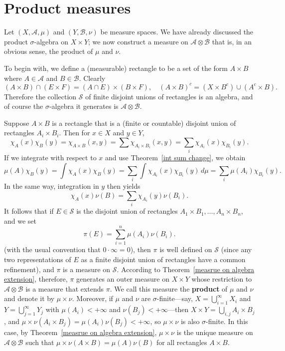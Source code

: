 \section{Product measures}\label{product measure}
Let $(X,\mathcal{A},\mu)$ and $(Y,\mathcal{B},\nu)$ be measure spaces. We have already discussed the product $\sigma$-algebra  on $X\times Y$; we now construct a measure on $\mathcal{A}\otimes\mathcal{B}$ that is, in an obvious sense, the product of $\mu$ and $\nu$.\par
To begin with, we define a (measurable) rectangle to be a set of the form $A\times B$ where $A\in\mathcal{A}$ and $B\in\mathcal{B}$. Clearly
\[(A\times B)\cap(E\times F)=(A\cap E)\times(B\times F),\quad(A\times B)^c=(X\times B^c)\cup(A^c\times B).\]
Therefore the collection $\mathcal{S}$ of finite disjoint unions of rectangles is an algebra, and of course the $\sigma$-algebra it generates is $\mathcal{A}\otimes\mathcal{B}$.\par
Suppose $A\times B$ is a rectangle that is a (finite or countable) disjoint union of rectangles $A_i\times B_i$. Then for $x\in X$ and $y\in Y$,
\[\chi_A(x)\chi_B(y)=\chi_{A\times B}(x,y)=\sum\chi_{A_i\times B_i}(x,y)=\sum_i\chi_{A_i}(x)\chi_{B_i}(y).\]
If we integrate with respect to $x$ and use Theorem~\ref{int sum change}, we obtain
\[\mu(A)\chi_B(y)=\int\chi_A(x)\chi_B(y)=\sum_i\int\chi_{A_i}(x)\chi_{B_i}(y)\,d\mu=\sum_i\mu(A_i)\chi_{B_i}(y).\]
In the same way, integration in $y$ then yields
\[\chi_A(x)\nu(B)=\sum_i\chi_{A_i}(y)\nu(B_i).\]
It follows that if $E\in\mathcal{S}$ is the disjoint union of rectangles $A_1\times B_1,\dots,A_n\times B_n$, and we set
\[\pi(E)=\sum_{i=1}^{n}\mu(A_i)\nu(B_i).\]
(with the usual convention that $0\cdot\infty=0$), then $\pi$ is well defined on $\mathcal{S}$ (since any two representations of $E$ as a finite disjoint union of rectangles have a common refinement), and $\pi$ is a measure on $\mathcal{S}$. According to Theorem~\ref{measrue on algebra extension}, therefore, $\pi$ generates an outer measure on $X\times Y$ whose restriction to $\mathcal{A}\otimes\mathcal{B}$ is a measure that extends $\pi$. We call this measure the \textbf{product} of $\mu$ and $\nu$ and denote it by $\mu\times\nu$. Moreover, if $\mu$ and $\nu$ are $\sigma$-finite---say, $X=\bigcup_{i=1}^{\infty}X_i$ and $Y=\bigcup_{j=1}^{\infty}Y_j$ with $\mu(A_i)<+\infty$ and $\nu(B_j)<+\infty$---then $X\times Y=\bigcup_{i,j}A_i\times B_j$, and $\mu\times\nu(A_i\times B_j)=\mu(A_i)\nu(B_j)<+\infty$, so $\mu\times\nu$ is also $\sigma$-finite. In this case, by Theorem~\ref{measrue on algebra extension}, $\mu\times\nu$ is the unique measure on $\mathcal{A}\otimes\mathcal{B}$ such that $\mu\times\nu(A\times B)=\mu(A)\nu(B)$ for all rectangles $A\times B$.\par
